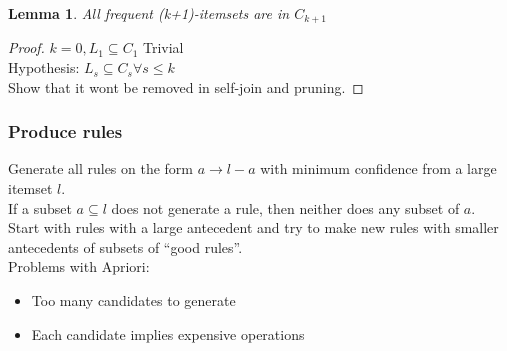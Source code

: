 \documentclass[a4paper]{article}
\newtheorem{lemma}{Lemma}
\begin{document}
\begin{lemma}
		All frequent (k+1)-itemsets are in $C_{k+1}$
\end{lemma}
\begin{proof}
		$k=0, L_1\subseteq C_1$ Trivial\\
		Hypothesis: $L_s\subseteq C_s \forall s\leq k$\\
		Show that it wont be removed in self-join and pruning.
\end{proof}
\subsubsection{Produce rules}
Generate all rules on the form $a\rightarrow l-a$ with minimum confidence from a
large itemset $l$.\\
If a subset $a\subseteq l$ does not generate a rule,  then neither does any
subset of $a$.\\
Start with rules with a large antecedent and try to make new rules with smaller
antecedents of subsets of ``good rules''.\\
Problems with Apriori:
\begin{itemize}
		\item Too many candidates to generate
		\item Each candidate implies expensive operations
\end{itemize}
\end{document}
